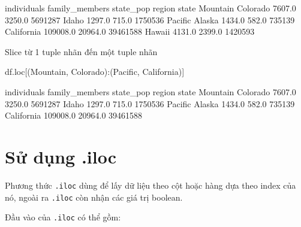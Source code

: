 \documentclass[
]{book}
\newenvironment{Shaded}{\begin{snugshade}}{\end{snugshade}}
\newcommand{\NormalTok}[1]{#1}
\newcommand{\StringTok}[1]{\textcolor[rgb]{0.31,0.60,0.02}{#1}}
\begin{document}
\begin{Shaded}
\begin{Highlighting}[]
\NormalTok{                     individuals  family\_members  state\_pop}
\NormalTok{region   state                                             }
\NormalTok{Mountain Colorado         7607.0          3250.0    5691287}
\NormalTok{         Idaho            1297.0           715.0    1750536}
\NormalTok{Pacific  Alaska           1434.0           582.0     735139}
\NormalTok{         California     109008.0         20964.0   39461588}
\NormalTok{         Hawaii           4131.0          2399.0    1420593}
\end{Highlighting}
\end{Shaded}

Slice từ 1 tuple nhãn đến một tuple nhãn

\begin{Shaded}
\begin{Highlighting}[]
\NormalTok{df.loc[(}\StringTok{\textquotesingle{}Mountain\textquotesingle{}}\NormalTok{, }\StringTok{\textquotesingle{}Colorado\textquotesingle{}}\NormalTok{):(}\StringTok{\textquotesingle{}Pacific\textquotesingle{}}\NormalTok{, }\StringTok{\textquotesingle{}California\textquotesingle{}}\NormalTok{)]}
\end{Highlighting}
\end{Shaded}

\begin{Shaded}
\begin{Highlighting}[]
\NormalTok{                     individuals  family\_members  state\_pop}
\NormalTok{region   state                                             }
\NormalTok{Mountain Colorado         7607.0          3250.0    5691287}
\NormalTok{         Idaho            1297.0           715.0    1750536}
\NormalTok{Pacific  Alaska           1434.0           582.0     735139}
\NormalTok{         California     109008.0         20964.0   39461588}
\end{Highlighting}
\end{Shaded}

\section{Sử dụng .iloc}\label{sux1eed-dux1ee5ng-.iloc}

Phương thức \texttt{.iloc} dùng để lấy dữ liệu theo cột hoặc hàng dựa theo index của nó, ngoài ra \texttt{.iloc} còn nhận các giá trị boolean.

Đầu vào của \texttt{.iloc} có thể gồm:
\end{document}
